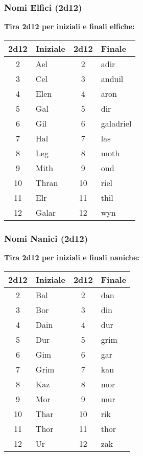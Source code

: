 \begin{multicols}{2}
{\subsubsection*{Nomi Elfici (2d12)}
\textbf{Tira 2d12 per iniziali e finali elfiche:}

\noindent\begin{tabular}{|c|l||c|l|}
\toprule
\textbf{2d12} & \textbf{Iniziale} & \textbf{2d12} & \textbf{Finale} \\
\midrule
2 & Ael & 2 & adir \\
3 & Cel & 3 & anduil \\
4 & Elen & 4 & aron \\
5 & Gal & 5 & dir \\
6 & Gil & 6 & galadriel \\
7 & Hal & 7 & las \\
8 & Leg & 8 & moth \\
9 & Mith & 9 & ond \\
10 & Thran & 10 & riel \\
11 & Elr & 11 & thil \\
12 & Galar & 12 & wyn \\
\bottomrule
\end{tabular}


\subsubsection*{Nomi Nanici (2d12)}
\textbf{Tira 2d12 per iniziali e finali naniche:}

\noindent\begin{tabular}{|c|l||c|l|}
\toprule
\textbf{2d12} & \textbf{Iniziale} & \textbf{2d12} & \textbf{Finale} \\
\midrule
2 & Bal & 2 & dan \\
3 & Bor & 3 & din \\
4 & Dain & 4 & dur \\
5 & Dur & 5 & grim \\
6 & Gim & 6 & gar \\
7 & Grim & 7 & kan \\
8 & Kaz & 8 & mor \\
9 & Mor & 9 & mur \\
10 & Thar & 10 & rik \\
11 & Thor & 11 & thor \\
12 & Ur & 12 & zak \\
\bottomrule
\end{tabular}



} %

\end{multicols}

\pagebreak


